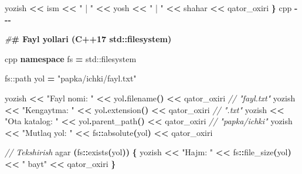 \documentclass[a4paper,11pt,twoside,openright]{book}
\newenvironment{Shaded}{\begin{snugshade}}{\end{snugshade}}
\newcommand{\BuiltInTok}[1]{#1}
\newcommand{\CommentTok}[1]{\textcolor[rgb]{0.56,0.35,0.01}{\textit{#1}}}
\newcommand{\ErrorTok}[1]{\textcolor[rgb]{0.64,0.00,0.00}{\textbf{#1}}}
\newcommand{\KeywordTok}[1]{\textcolor[rgb]{0.13,0.29,0.53}{\textbf{#1}}}
\newcommand{\NormalTok}[1]{#1}
\newcommand{\OperatorTok}[1]{\textcolor[rgb]{0.81,0.36,0.00}{\textbf{#1}}}
\newcommand{\PreprocessorTok}[1]{\textcolor[rgb]{0.56,0.35,0.01}{\textit{#1}}}
\newcommand{\StringTok}[1]{\textcolor[rgb]{0.31,0.60,0.02}{#1}}
\begin{document}
\begin{Shaded}
\begin{Highlighting}[]
\NormalTok{    yozish }\OperatorTok{\textless{}\textless{}}\NormalTok{ ism }\OperatorTok{\textless{}\textless{}} \StringTok{" | "} \OperatorTok{\textless{}\textless{}}\NormalTok{ yosh }\OperatorTok{\textless{}\textless{}} \StringTok{" | "} \OperatorTok{\textless{}\textless{}}\NormalTok{ shahar }\OperatorTok{\textless{}\textless{}}\NormalTok{ qator\_oxiri}
\OperatorTok{\}}
\ErrorTok{\textasciigrave{}\textasciigrave{}\textasciigrave{}}\NormalTok{cpp}
\OperatorTok{{-}{-}{-}}

\PreprocessorTok{\#}\ErrorTok{\# Fayl yo\textquotesingle{}llari (C++17 \textasciigrave{}std::filesystem\textasciigrave{})}

\ErrorTok{\textasciigrave{}\textasciigrave{}\textasciigrave{}}\NormalTok{cpp}
\KeywordTok{namespace}\NormalTok{ fs }\OperatorTok{=} \BuiltInTok{std::}\NormalTok{filesystem}

\NormalTok{fs::path yol }\OperatorTok{=} \StringTok{"papka/ichki/fayl.txt"}

\NormalTok{yozish }\OperatorTok{\textless{}\textless{}} \StringTok{"Fayl nomi: "} \OperatorTok{\textless{}\textless{}}\NormalTok{ yol}\OperatorTok{.}\NormalTok{filename}\OperatorTok{()} \OperatorTok{\textless{}\textless{}}\NormalTok{ qator\_oxiri       }\CommentTok{// "fayl.txt"}
\NormalTok{yozish }\OperatorTok{\textless{}\textless{}} \StringTok{"Kengaytma: "} \OperatorTok{\textless{}\textless{}}\NormalTok{ yol}\OperatorTok{.}\NormalTok{extension}\OperatorTok{()} \OperatorTok{\textless{}\textless{}}\NormalTok{ qator\_oxiri      }\CommentTok{// ".txt"}
\NormalTok{yozish }\OperatorTok{\textless{}\textless{}} \StringTok{"Ota katalog: "} \OperatorTok{\textless{}\textless{}}\NormalTok{ yol}\OperatorTok{.}\NormalTok{parent\_path}\OperatorTok{()} \OperatorTok{\textless{}\textless{}}\NormalTok{ qator\_oxiri  }\CommentTok{// "papka/ichki"}
\NormalTok{yozish }\OperatorTok{\textless{}\textless{}} \StringTok{"Mutlaq yo\textquotesingle{}l: "} \OperatorTok{\textless{}\textless{}}\NormalTok{ fs}\OperatorTok{::}\NormalTok{absolute}\OperatorTok{(}\NormalTok{yol}\OperatorTok{)} \OperatorTok{\textless{}\textless{}}\NormalTok{ qator\_oxiri}

\CommentTok{// Tekshirish}
\NormalTok{agar }\OperatorTok{(}\NormalTok{fs}\OperatorTok{::}\NormalTok{exists}\OperatorTok{(}\NormalTok{yol}\OperatorTok{))} \OperatorTok{\{}
\NormalTok{    yozish }\OperatorTok{\textless{}\textless{}} \StringTok{"Hajm: "} \OperatorTok{\textless{}\textless{}}\NormalTok{ fs}\OperatorTok{::}\NormalTok{file\_size}\OperatorTok{(}\NormalTok{yol}\OperatorTok{)} \OperatorTok{\textless{}\textless{}} \StringTok{" bayt"} \OperatorTok{\textless{}\textless{}}\NormalTok{ qator\_oxiri}
\OperatorTok{\}}


\end{Highlighting}
\end{Shaded}
\end{document}
